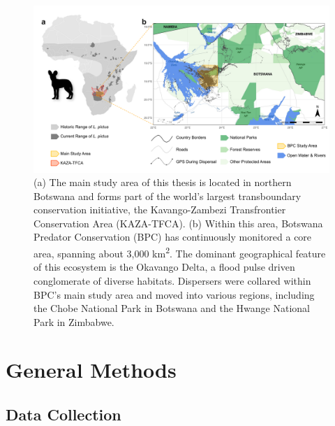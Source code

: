 \documentclass[../FinalThesis.tex]{subfiles}
\begin{document}
\begin{figure}[htpb]
\begin{center}
  \includegraphics[width = \textwidth]{Figures/GeneralStudyArea.pdf}
  \caption{(a) The main study area of this thesis is located in northern
  Botswana and forms part of the world's largest transboundary conservation
  initiative, the Kavango-Zambezi Transfrontier Conservation Area (KAZA-TFCA).
  (b) Within this area, Botswana Predator Conservation (BPC) has continuously
  monitored a core area, spanning about 3,000 km\textsuperscript{2}. The
  dominant geographical feature of this ecosystem is the Okavango Delta, a flood
  pulse driven conglomerate of diverse habitats. Dispersers were collared within
  BPC's main study area and moved into various regions, including the Chobe
  National Park in Botswana and the Hwange National Park in Zimbabwe.}
  \label{GeneralStudyArea}
\end{center}
\end{figure}

\section{General Methods}

\subsection{Data Collection}
\end{document}
